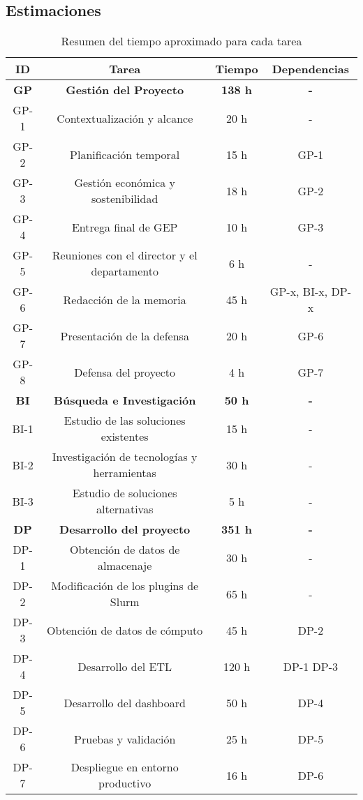 \subsection{Estimaciones}
\begin{table}[H]
    \centering
    \begin{tabular}{|c|c|c|c|}
        \hline
        \textbf{ID} & \textbf{Tarea} & \textbf{Tiempo} & \textbf{Dependencias} \\
        \hline
        \textbf{GP} & \textbf{Gestión del Proyecto} & \textbf{138 h} & \textbf{-} \\
        \hline
        GP-1 & Contextualización y alcance & 20 h & - \\
        GP-2 & Planificación temporal & 15 h & GP-1 \\
        GP-3 & Gestión económica y sostenibilidad & 18 h & GP-2 \\
        GP-4 & Entrega final de GEP & 10 h & GP-3 \\
        GP-5 & Reuniones con el director y el departamento & 6 h & - \\
        GP-6 & Redacción de la memoria & 45 h & GP-x\footnotemark, BI-x, DP-x\\
        GP-7 & Presentación de la defensa & 20 h & GP-6 \\
        GP-8 & Defensa del proyecto & 4 h & GP-7 \\
        \hline
        \textbf{BI} & \textbf{Búsqueda e Investigación} & \textbf{50 h} & \textbf{-} \\
        \hline
        BI-1 & Estudio de las soluciones existentes & 15 h & - \\
        BI-2 & Investigación de tecnologías y herramientas & 30 h & - \\
        BI-3 & Estudio de soluciones alternativas & 5 h & - \\
        \hline
        \textbf{DP} & \textbf{Desarrollo del proyecto} & \textbf{351 h} & \textbf{-} \\
        \hline
        DP-1 & Obtención de datos de almacenaje & 30 h & - \\
        DP-2 & Modificación de los plugins de Slurm & 65 h & - \\
        DP-3 & Obtención de datos de cómputo & 45 h & DP-2 \\
        DP-4 & Desarrollo del ETL & 120 h & DP-1 DP-3 \\
        DP-5 & Desarrollo del dashboard & 50 h & DP-4 \\
        DP-6 & Pruebas y validación & 25 h & DP-5 \\
        DP-7 & Despliegue en entorno productivo & 16 h & DP-6 \\
        \hline
    \end{tabular}
    \caption{Resumen del tiempo aproximado para cada tarea}
    \label{tab:estimaciones}
\end{table}

\